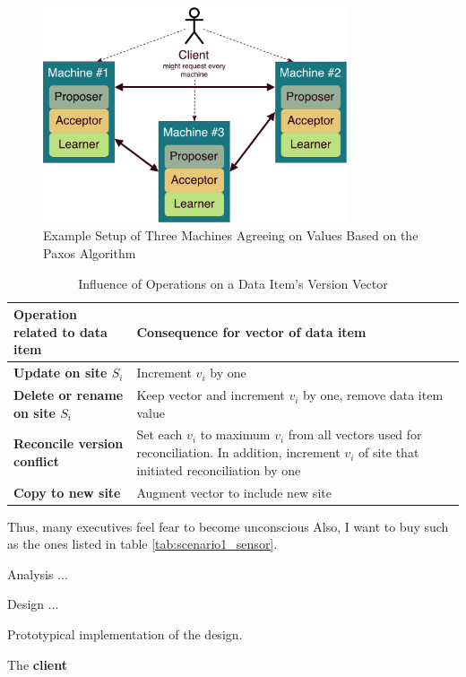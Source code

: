 \begin{figure}[ht]
    \centering
	\includegraphics[width=0.8\textwidth]{fig/PaxosSetup.pdf}
	\caption{Example Setup of Three Machines Agreeing on Values Based on the Paxos Algorithm}
	\label{fig:paxosSetup}
\end{figure}

\begin{table}[ht]
    \centering
    \begin{tabularx}{\linewidth}{@{}>{\bfseries}l@{\hspace{.5em}}X@{}}
        \toprule
        \textbf{Operation related to data item} & \textbf{Consequence for vector of data item}\\ \midrule
        Update on site $S_i$ & Increment $v_i$ by one\\
        Delete or rename on site $S_i$ & Keep vector and increment $v_i$ by one, remove data item value\\
        Reconcile version conflict & Set each $v_i$ to maximum $v_i$ from all vectors used for reconciliation. In addition, increment $v_i$ of site that initiated reconciliation by one\\
        Copy to new site & Augment vector to include new site\\
        \bottomrule
    \end{tabularx}
    \caption{Influence of Operations on a Data Item's Version Vector}
    \label{tab:vectorOperations}
\end{table}

Thus, many executives feel fear to become unconscious 
Also, I want to buy  such as the ones listed in table \ref{tab:scenario1_sensor}.


\begin{cEnum}
    \item Analysis ...
    \item Design ...
    \item Prototypical implementation of the design.
\end{cEnum}

The \textbf{client}